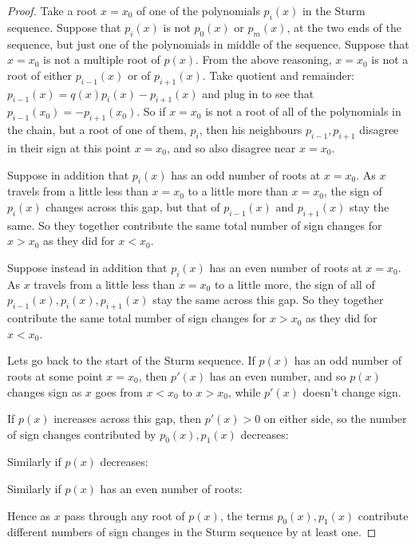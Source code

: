 \begin{proof}
Take a root \(x=x_0\) of one of the polynomials \(p_i(x)\) in the Sturm sequence.
Suppose that \(p_i(x)\) is not \(p_0(x)\) or \(p_m(x)\), at the two ends of the sequence, but just one of the polynomials in middle of the sequence.
Suppose that \(x=x_0\) is not a multiple root of \(p(x)\).
From the above reasoning, \(x=x_0\) is not a root of either \(p_{i-1}(x)\) or of \(p_{i+1}(x)\).
Take quotient and remainder: \(p_{i-1}(x) = q(x) p_i(x) - p_{i+1}(x)\) and plug in to see that 
\(p_{i-1}(x_0)=-p_{i+1}(x_0)\).
So if \(x=x_0\) is not a root of all of the polynomials in the chain, but a root of one of them, \(p_i\), then his neighbours \(p_{i-1}, p_{i+1}\) disagree in their sign at this point \(x=x_0\), and so also disagree near \(x=x_0\).
\begin{center}
\qquad
\qquad
\qquad

\end{center}
Suppose in addition that \(p_i(x)\) has an odd number of roots at \(x=x_0\).
As \(x\) travels from a little less than \(x=x_0\) to a little more than \(x=x_0\), the sign of \(p_i(x)\) changes across this gap, but that of \(p_{i-1}(x)\) and \(p_{i+1}(x)\) stay the same.
So they together contribute the same total number of sign changes for \(x>x_0\) as they did for \(x<x_0\).
\begin{center}
\qquad

\end{center}
Suppose instead in addition that \(p_i(x)\) has an even number of roots at \(x=x_0\).
As \(x\) travels from a little less than \(x=x_0\) to a little more, the sign of all of \(p_{i-1}(x), p_i(x), p_{i+1}(x)\) stay the same across this gap.
So they together contribute the same total number of sign changes for \(x>x_0\) as they did for \(x<x_0\).
\begin{center}
\qquad

\end{center}
Lets go back to the start of the Sturm sequence.
If \(p(x)\) has an odd number of roots at some point \(x=x_0\), then \(p'(x)\) has an even number, and so \(p(x)\) changes sign as \(x\) goes from \(x < x_0\) to \(x > x_0\), while \(p'(x)\) doesn't change sign.
\begin{center}
\qquad

\end{center}
If \(p(x)\) increases across this gap, then \(p'(x)>0\) on either side, so the number of sign changes contributed by \(p_0(x), p_1(x)\) decreases:
\begin{center}

\end{center}
Similarly if \(p(x)\) decreases:
\begin{center}

\end{center}
Similarly if \(p(x)\) has an even number of roots:
\begin{center}
\qquad

\end{center}
Hence as \(x\) pass through any root of \(p(x)\), the terms \(p_0(x), p_1(x)\) contribute different numbers of sign changes in the Sturm sequence by at least one.
\end{proof}
